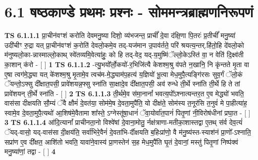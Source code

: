 \documentclass[17pt]{extarticle}
\begin{document}
     \section*{ 6.1      षष्ठकाण्डे प्रथमः प्रश्नः - सोममन्त्रब्राह्मणनिरूपणं }
                                        \textbf{ TS 6.1.1.1} \newline
                  प्रा॒चीन॑वꣳशं करोति देवमनु॒ष्या दिशो॒ व्य॑भजन्त॒ प्राचीं᳚ दे॒वा द॑क्षि॒णा पि॒तरः॑ प्र॒तीचीं᳚ मनु॒ष्या॑ उदी॑चीꣳ रु॒द्रा यत् प्रा॒चीन॑वꣳशं क॒रोति॑ देवलो॒कमे॒व तद्-यज॑मान उ॒पाव॑र्तते॒ परि॑ श्रयत्य॒न्तर्.हि॑तो॒हि दे॑वलो॒को म॑नुष्यलो॒का-न्नास्माल्लो॒काथ् स्वे॑तव्यमि॒वेत्या॑हुः॒ को हि तद्-वेद॒ यद्-य॒मुष्मि॑ॅल्लो॒केऽस्ति॑ वा॒ न वेति॑ दि॒क्ष्व॑ती का॒शान् क॑रो - [  ] \textbf{  1} \newline
                  \newline
                                \textbf{ TS 6.1.1.2} \newline
                  -त्यु॒भयो᳚र्लो॒कयो॑-र॒भिजि॑त्यै केशश्म॒श्रु व॑पते न॒खानि॒ नि कृ॑न्तते मृ॒ता वा ए॒षा त्वग॑मे॒द्ध्या यत् के॑शश्म॒श्रु मृ॒तामे॒व त्वच॑म-मे॒द्ध्याम॑प॒हत्य॑ य॒ज्ञियो॑ भू॒त्वा मेध॒मुपै॒त्यङ्गि॑रसः सुव॒र्गं ॅलो॒कं ॅयन्तो॒ऽफ्सु दी᳚क्षात॒पसी॒ प्रावे॑शयन्न॒फ्सु स्ना॑ति सा॒क्षादे॒व दी᳚क्षात॒पसी॒ अव॑ रुन्धे ती॒र्थे स्ना॑ति ती॒र्थे हि ते तां प्रावे॑शयन् ती॒र्थे स्ना॑ति - [  ] \textbf{  2} \newline
                  \newline
                                \textbf{ TS 6.1.1.3} \newline
                  ती॒र्थमे॒व स॑मा॒नानां᳚ भवत्य॒पो᳚ऽश्नात्यन्तर॒त ए॒व मेद्ध्यो॑ भवति॒ वास॑सा दीक्षयति सौ॒म्यं ॅवै क्षौमं॑ दे॒वत॑या॒ सोम॑मे॒ष दे॒वता॒मुपै॑ति॒ यो दीक्ष॑ते॒ सोम॑स्य त॒नूर॑सि त॒नुवं॑ मे पा॒हीत्या॑ह॒ स्वामे॒व दे॒वता॒मुपै॒त्यथो॑ आ॒शिष॑मे॒वैतामा शा᳚स्ते॒ ऽग्नेस्तू॑षा॒धानं॑ ॅवा॒योर्वा॑त॒पानं॑ पितृ॒णां नी॒विरोष॑धीनां प्रघा॒त - [  ] \textbf{  3} \newline
                  \newline
                                \textbf{ TS 6.1.1.4} \newline
                  आ॑दि॒त्यानां᳚ प्राचीनता॒नो विश्वे॑षां दे॒वाना॒मोतु॒ र्नक्ष॑त्राणा-मतीका॒शास्तद्वा ए॒तथ् स॑र्व देव॒त्यं॑ ॅयद्-वासो॒ यद्-वास॑सा दी॒क्षय॑ति॒ सर्वा॑भिरे॒वैनं॑ दे॒वता॑भि-र्दीक्षयति ब॒हिःप्रा॑णो॒ वै म॑नु॒ष्य॑स्त-स्याश॑नं प्रा॒णो᳚-ऽश्नाति॒ सप्रा॑ण ए॒व दी᳚क्षत॒ आशि॑तो भवति॒ यावा॑ने॒वास्य॑ प्रा॒णस्तेन॑ स॒ह मेध॒मुपै॑ति घृ॒तं दे॒वानां॒ मस्तु॑ पितृ॒णां निष्प॑क्वं मनु॒ष्या॑णां॒ तद्वा - [  ] \textbf{  4} \newline
\end{document}
